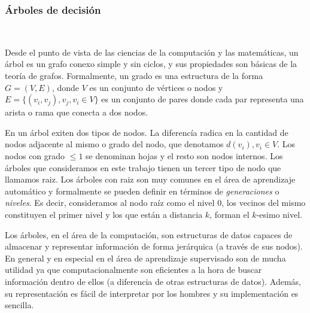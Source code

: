 \subsubsection{Árboles de decisión} ~\\
\label{subsection:arboles_decision}

Desde el punto de vista de las ciencias de la computación y las matemáticas, un
árbol es un grafo conexo simple y sin ciclos, y sus propiedades son básicas de
la teoría de grafos. Formalmente, un grado es una estructura de la forma $G=(V,E)$, donde $V$ es un conjunto de vértices o nodos y $E=\{ (v_i, v_j), v_j,v_i \in V \}$ es un
conjunto de pares donde cada par representa una arista o rama que conecta a dos nodos.


	En un árbol exiten dos tipos de nodos. La diferencía radica en la cantidad de nodos adjacente al mismo o grado del nodo, que denotamos $d(v_i), v_i \in V$. Los nodos con grado $\leq 1$ se denominan hojas y el resto son nodos internos. Los árboles que consideramos en este trabajo tienen un tercer tipo de nodo que llamamos raiz. Los árboles con raiz son muy comunes en el área de aprendizaje automático y formalmente se pueden definir en términos de \textit{generaciones} o \textit{niveles}. Es decir, consideramos al nodo raíz como el nivel 0, los vecinos del mismo constituyen el primer nivel y los que están a distancia $k$, forman el $k$-esimo nivel.

	Los árboles, en el área de la computación, son estructuras de datos capaces de almacenar y representar información de forma jerárquica (a través de sus nodos). En general y en especial en el área de aprendizaje supervisado son de mucha utilidad ya que computacionalmente son eficientes a la hora de buscar información dentro de ellos (a diferencia de otras estructuras de datos). Además, su representación es fácil de interpretar por los hombres y su implementación es sencilla.

